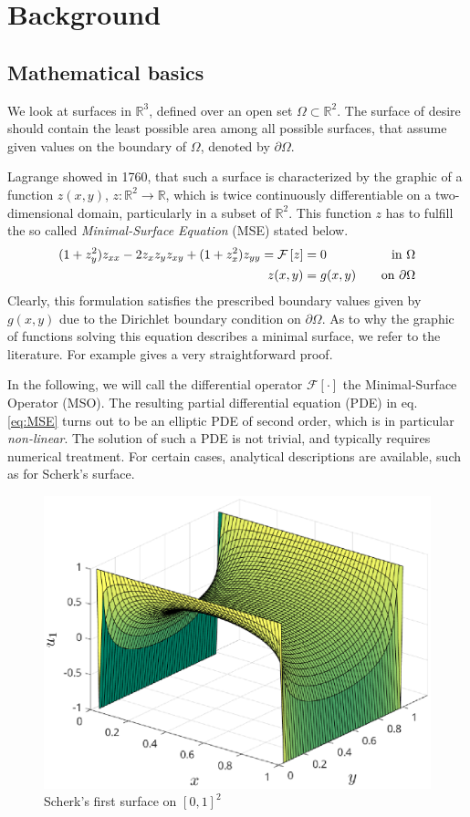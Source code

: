 \documentclass[11pt]{scrartcl}
\newcommand{\mSurf}[1]{\ensuremath{\mathcal{F}\left[#1\right]}}
\begin{document}
\section{Background}
\subsection{Mathematical basics}\label{sec:mathbasics}
We look at surfaces in $ \mathbb{R}^3 $, defined over an open set $\Omega \subset \mathbb{R}^2$. 
The surface of desire should contain the least possible area among all possible surfaces, that assume given values on the boundary of $\Omega$, denoted by $\partial \Omega$. \cite{Sakai1976}

Lagrange showed in 1760, that such a surface is characterized by the graphic of a function $z(x,y)$, $z: \mathbb{R}^2 \to \mathbb{R} $, which is twice continuously differentiable on a two-dimensional domain, particularly in a subset of $\mathbb{R}^2$.
This function $z$ has to fulfill the so called \textit{Minimal-Surface Equation} (MSE) stated below.
\begin{align}\label{eq:MSE}
	(1+z_y^2) z_{xx} - 2 z_x z_y z_{xy} + (1+z_x^2)z_{yy} = \mSurf{z} &= 0 \quad &\text{in } \Omega \\
	z(x,y) &= g(x,y) \quad &\text{on } \partial \Omega \notag
\end{align}
Clearly, this formulation satisfies the prescribed boundary values given by $g(x,y)$ due to the Dirichlet boundary condition on $\partial\Omega$.
As to why the graphic of functions solving this equation describes a minimal surface, we refer to the literature. For example \cite{Sakai1976} gives a very straightforward proof.

In the following, we will call the differential operator $\mSurf{\cdot}$ the Minimal-Surface Operator (MSO). The resulting partial differential equation (PDE) in eq. \eqref{eq:MSE} turns out to be an elliptic PDE of second order, which is in particular \textit{non-linear}. The solution of such a PDE is not trivial, and typically requires numerical treatment. For certain cases, analytical descriptions are available, such as for Scherk's surface.

\begin{figure}
	\centering
	\includegraphics[width=.5\textwidth]{figs/scherk-test}
	\caption{Scherk's first surface on $[0,1]^2$}\label{fig:scherk01}
\end{figure}
\end{document}
